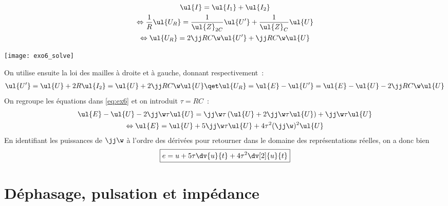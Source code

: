 \documentclass[a4paper, 12pt, final, garamond]{book}
\begin{document}
\begin{minipage}{0.70\linewidth}
    \begin{gather}
        \nonumber
        \ul{I} = \ul{I_1} + \ul{I_2}\\
        \nonumber
        \Leftrightarrow
        \frac{1}{R}\ul{U_R} = \frac{1}{\ul{Z}_{2C}}\ul{U'} + \frac{1}{\ul{Z}_C}\ul{U}\\
        \label{eq:ex6}
        \Leftrightarrow
        \ul{U_R} = 2\jj RC\w\ul{U'} + \jj RC\w\ul{U}
    \end{gather}
\end{minipage}
\begin{minipage}{0.30\linewidth}
    \centering
    \texttt{[image: exo6\_solve]}
\end{minipage}
On utilise ensuite la loi des mailles à droite et à gauche, donnant
respectivement~:
\begin{gather*}
    \ul{U'} = \ul{U} + 2R\ul{I_2} = \ul{U} + 2\jj RC\w\ul{U}
    \qet
    \ul{U_R} = \ul{E} - \ul{U'} = \ul{E} - \ul{U} - 2\jj RC\w\ul{U}
\end{gather*}
On regroupe les équations dans \ref{eq:ex6} et on introduit $\tau = RC$~:
\begin{gather*}
    \ul{E} - \ul{U} - 2\jj\w\tau\ul{U} = \jj\w\tau \left( \ul{U} +
    2\jj\w\tau\ul{U} \right) + \jj\w\tau\ul{U}\\
    \Leftrightarrow
    \ul{E} = \ul{U} + 5\jj\w\tau\ul{U} + 4\tau^2 (\jj\w)^2\ul{U}
\end{gather*}
En identifiant les puissances de $\jj\w$ à l'ordre des dérivées pour retourner
dans le domaine des représentations réelles, on a donc bien
\begin{gather*}
    \boxed{
        e = u + 5\tau \dv{u}{t} + 4\tau^2 \dv[2]{u}{t}}
\end{gather*}
\relax
\section{Déphasage, pulsation et impédance}
\end{document}
